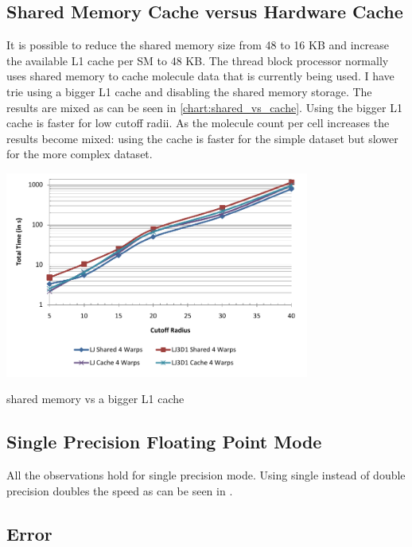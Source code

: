 \subsection{Shared Memory Cache versus Hardware Cache}
It is possible to reduce the shared memory size from 48 to 16 KB and increase the available L1 cache per SM to 48 KB.
The thread block processor normally uses shared memory to cache molecule data that is currently being used.
I have trie using a bigger L1 cache and disabling the shared memory storage. The results are mixed as can be seen in \autoref{chart:shared_vs_cache}.
Using the bigger L1 cache is faster for low cutoff radii. As the molecule count per cell increases the results become mixed: using the cache is faster for the simple  dataset but slower for the more complex  dataset.
\begin{chart}
\centering
\includegraphics[width=0.75\textwidth]{plots/shared_vs_cached_tb_tesla.pdf}
\caption{shared memory vs a bigger L1 cache}
\label{chart:shared_vs_cache}
\end{chart}

\subsection{Single Precision Floating Point Mode}
All the observations hold for single precision mode. Using single instead of double precision doubles the speed as can be seen in .

\subsection{Error}